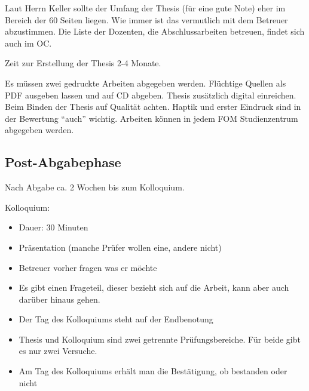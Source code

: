 Laut Herrn Keller sollte der Umfang der Thesis (für eine gute Note) eher im Bereich der 60 Seiten liegen. Wie immer ist das vermutlich mit dem Betreuer abzustimmen. Die Liste der Dozenten, die Abschlussarbeiten betreuen, findet sich auch im \ac{OC}.

Zeit zur Erstellung der Thesis 2-4 Monate.

Es müssen zwei gedruckte Arbeiten abgegeben werden. Flüchtige Quellen als PDF ausgeben lassen und auf CD abgeben. Thesis zusätzlich digital einreichen. Beim Binden der Thesis auf Qualität achten. Haptik und erster Eindruck sind in der Bewertung \enquote{auch} wichtig. Arbeiten können in jedem FOM Studienzentrum abgegeben werden.

\subsection{Post-Abgabephase}
Nach Abgabe ca. 2 Wochen bis zum Kolloquium.

Kolloquium:
\begin{itemize}
\item Dauer: 30 Minuten
\item Präsentation (manche Prüfer wollen eine, andere nicht)
\item Betreuer vorher fragen was er möchte
\item Es gibt einen Frageteil, dieser bezieht sich auf die Arbeit, kann aber auch darüber hinaus gehen.
\item Der Tag des Kolloquiums steht auf der Endbenotung
\item Thesis und Kolloquium sind zwei getrennte Prüfungsbereiche. Für beide gibt es nur zwei Versuche.
\item Am Tag des Kolloquiums erhält man die Bestätigung, ob bestanden oder nicht
\end{itemize}
